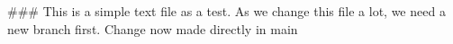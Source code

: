 ###
This is a simple text file as a test.
As we change this file a lot, we need a new branch first.
Change now made directly in main
